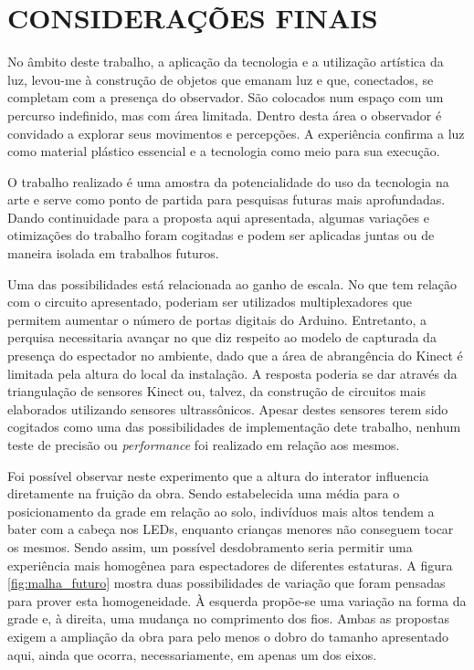 \chapter{CONSIDERAÇÕES FINAIS}

No âmbito deste trabalho, a aplicação da tecnologia e a utilização artística da luz, levou-me à construção de objetos que emanam luz e que, conectados, se completam com a presença do observador. São colocados num espaço com um percurso indefinido, mas com área limitada. Dentro desta área o observador é convidado a explorar seus movimentos e percepções. A experiência confirma a luz como material plástico essencial e a tecnologia como meio para sua execução.

O trabalho realizado é uma amostra da potencialidade do uso da tecnologia na arte e serve como ponto de partida para pesquisas futuras mais aprofundadas. Dando continuidade para a proposta aqui apresentada, algumas variações e otimizações do trabalho foram cogitadas e podem ser aplicadas juntas ou de maneira isolada em trabalhos futuros.

Uma das possibilidades está relacionada ao ganho de escala. No que tem relação com o circuito apresentado, poderiam ser utilizados multiplexadores que permitem aumentar o número de portas digitais do Arduino. Entretanto, a perquisa necessitaria avançar no que diz respeito ao modelo de capturada da presença do espectador no ambiente, dado que a área de abrangência do Kinect é limitada pela altura do local da instalação. A resposta poderia se dar através da triangulação de sensores Kinect ou, talvez, da construção de circuitos mais elaborados utilizando sensores ultrassônicos. Apesar destes sensores terem sido cogitados como uma das possibilidades de implementação dete trabalho, nenhum teste de precisão ou \textit{performance} foi realizado em relação aos mesmos.

Foi possível observar neste experimento que a altura do interator influencia diretamente na fruição da obra. Sendo estabelecida uma média para o posicionamento da grade em relação ao solo, indivíduos mais altos tendem a bater com a cabeça nos LEDs, enquanto crianças menores não conseguem tocar os mesmos. Sendo assim, um possível desdobramento seria permitir uma experiência mais homogênea para espectadores de diferentes estaturas. A figura \ref{fig:malha_futuro} mostra duas possibilidades de variação que foram pensadas para prover esta homogeneidade. À esquerda propõe-se uma variação na forma da grade e, à direita, uma mudança no comprimento dos fios. Ambas as propostas exigem a ampliação da obra para pelo menos o dobro do tamanho apresentado aqui, ainda que ocorra, necessariamente, em apenas um dos eixos. 

